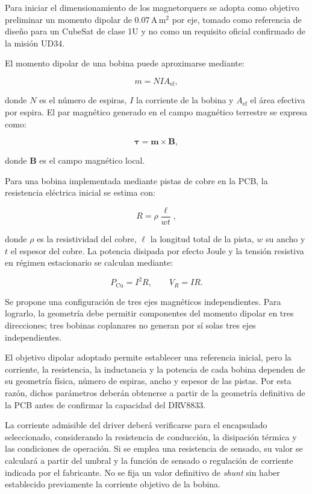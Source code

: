 \documentclass[11pt,a4paper]{article}
\begin{document}
Para iniciar el dimensionamiento de los magnetorquers se adopta
como objetivo preliminar un momento dipolar de
\(0.07\,\mathrm{A\,m^2}\) por eje, tomado como referencia de diseño
para un CubeSat de clase 1U y no como un requisito oficial confirmado
de la misión UD34.

El momento dipolar de una bobina puede aproximarse mediante:

\[
m=NIA_{\mathrm{ef}},
\]

donde \(N\) es el número de espiras, \(I\) la corriente de la bobina
y \(A_{\mathrm{ef}}\) el área efectiva por espira. El par magnético
generado en el campo magnético terrestre se expresa como:

\[
\boldsymbol{\tau}=\boldsymbol{m}\times\boldsymbol{B},
\]

donde \(\boldsymbol{B}\) es el campo magnético local.

Para una bobina implementada mediante pistas de cobre en la PCB,
la resistencia eléctrica inicial se estima con:

\[
R=\rho\frac{\ell}{wt},
\]

donde \(\rho\) es la resistividad del cobre, \(\ell\) la longitud
total de la pista, \(w\) su ancho y \(t\) el espesor del cobre.
La potencia disipada por efecto Joule y la tensión resistiva en
régimen estacionario se calculan mediante:

\[
P_{\mathrm{Cu}}=I^2R,
\qquad
V_R=IR.
\]

Se propone una configuración de tres ejes magnéticos independientes.
Para lograrlo, la geometría debe permitir componentes del momento
dipolar en tres direcciones; tres bobinas coplanares no generan
por sí solas tres ejes independientes.

El objetivo dipolar adoptado permite establecer una referencia
inicial, pero la corriente, la resistencia, la inductancia y la
potencia de cada bobina dependen de su geometría física, número
de espiras, ancho y espesor de las pistas. Por esta razón, dichos
parámetros deberán obtenerse a partir de la geometría definitiva
de la PCB antes de confirmar la capacidad del DRV8833.

La corriente admisible del driver deberá verificarse para el
encapsulado seleccionado, considerando la resistencia de conducción,
la disipación térmica y las condiciones de operación. Si se emplea
una resistencia de sensado, su valor se calculará a partir del
umbral y la función de sensado o regulación de corriente indicada
por el fabricante. No se fija un valor definitivo de \textit{shunt}
sin haber establecido previamente la corriente objetivo de la bobina.
\end{document}

